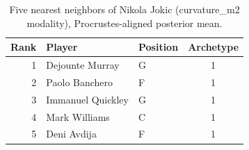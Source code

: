 \begin{table}[htbp]
  \centering\small
  \begin{tabular}{rllc}
    \toprule
    Rank & Player & Position & Archetype \\
    \midrule
    1 & Dejounte Murray & G & 1 \\
    2 & Paolo Banchero & F & 1 \\
    3 & Immanuel Quickley & G & 1 \\
    4 & Mark Williams & C & 1 \\
    5 & Deni Avdija & F & 1 \\
    \bottomrule
  \end{tabular}
  \caption{Five nearest neighbors of Nikola Jokic (curvature_m2 modality), Procrustes-aligned posterior mean.}
  \label{tab:Nikola_Jokic_neighbors_curvature_m2}
\end{table}

